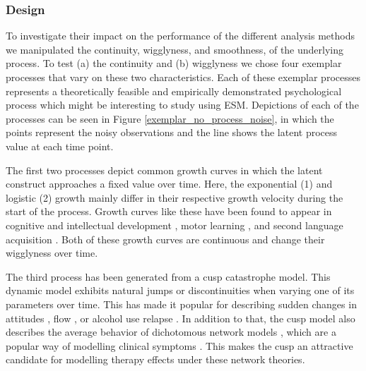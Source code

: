 \subsubsection{Design}

To investigate their impact on the performance of the different analysis
methods
we manipulated the continuity, wigglyness, and smoothness, of the underlying
process. To test (a) the continuity and (b) wigglyness we chose four exemplar
processes that vary on these two characteristics. Each of these exemplar
processes represents a theoretically feasible and empirically demonstrated
psychological process which might be interesting to study using ESM.
Depictions of each of the processes can be seen in Figure
\ref{exemplar_no_process_noise}, in which the points represent the noisy
observations and the line shows the latent process value at each time point.

\begin{figure*}
    \caption{Non-linear exemplar processes}
    \label{exemplar_no_process_noise}
\end{figure*}

The first two processes depict common growth curves in which the latent
construct approaches a fixed value over time.
Here, the exponential (1) and logistic (2) growth mainly differ in their
respective growth velocity during the start of the process. Growth curves
like these have been found to appear in cognitive and intellectual development
\parencite{mcardle_comparative_2002,kunnen_dynamic_2012}, motor learning
\parencite{newell_time_2001}, and second language acquisition
\parencite{de_bot_dynamic_2007}. Both of these growth curves are continuous and
change their wigglyness over time.

The third process has been generated from a cusp catastrophe model.
This dynamic model exhibits natural jumps or discontinuities when
varying one of its parameters over time. This has made it popular for
describing sudden changes in attitudes \parencite{van_der_maas_sudden_2003},
flow \parencite{ceja_dynamics_2009}, or alcohol use relapse
\parencite{witkiewitz_modeling_2007}. In addition to that, the cusp model also
describes the average behavior of dichotomous network models
\parencite{finnemann_theoretical_2021}, which are a popular way of modelling
clinical symptoms \parencite{borsboom_network_2013}. This makes the cusp an
attractive candidate for modelling therapy effects under these network
theories.

